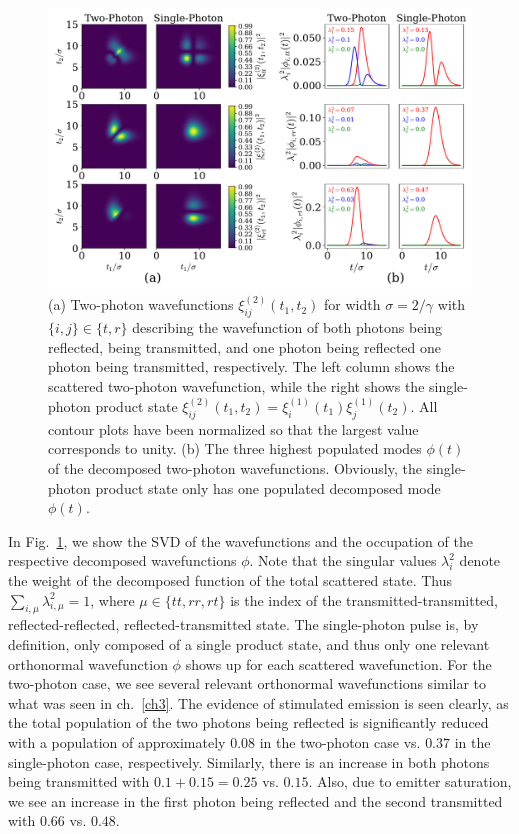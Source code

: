 \begin{figure}[H]
    \centering
    \includegraphics[width=\linewidth]{figures/lodahl_fig3.pdf}
    \caption{(a) Two-photon wavefunctions $\xi^{(2)}_{ij}(t_1,t_2)$ for width $\sigma = 2/\gamma$ with $\{i,j\} \in \{t,r\}$ describing the wavefunction of both photons being reflected, being transmitted, and one photon being reflected one photon being transmitted, respectively. The left column shows the scattered two-photon wavefunction, while the right shows the single-photon product state $\xi^{(2)}_{ij}(t_1,t_2) = \xi^{(1)}_{i}(t_1)\xi^{(1)}_{j}(t_2)$. All contour plots have been normalized so that the largest value corresponds to unity. (b) The three highest populated modes $\phi(t)$ of the decomposed two-photon wavefunctions. Obviously, the single-photon product state only has one populated decomposed mode $\phi(t)$.}
    \label{fig:lodahlfig3}
\end{figure}

In Fig.~\ref{fig:lodahlfig3}, we show the SVD of the wavefunctions and the occupation of the respective decomposed wavefunctions $\phi$. Note that the singular values $\lambda_i^2$ denote the weight of the decomposed function of the total scattered state. Thus $\sum_{i,\mu} \lambda_{i,\mu}^2 = 1$, where $\mu \in \{tt,rr,rt\}$ is the index of the transmitted-transmitted, reflected-reflected, reflected-transmitted state. The single-photon pulse is, by definition, only composed of a single product state, and thus only one relevant orthonormal wavefunction $\phi$ shows up for each scattered wavefunction. For the two-photon case, we see several relevant orthonormal wavefunctions similar to what was seen in ch.~\ref{ch3}. The evidence of stimulated emission is seen clearly, as the total population of the two photons being reflected is  significantly reduced with a population of approximately $0.08$ in the two-photon case vs. $0.37$ in the single-photon case, respectively. Similarly, there is an increase in both photons being transmitted with $0.1+0.15 = 0.25$ vs. $0.15$. Also, due to emitter saturation, we see an increase in the first photon being reflected and the second transmitted with $0.66$ vs. $0.48$.



